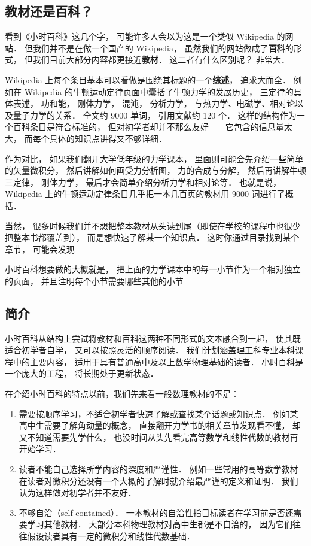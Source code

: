 
\subsection{教材还是百科？}
看到《小时百科》这几个字， 可能许多人会以为这是一个类似 Wikipedia 的网站． 但我们并不是在做一个国产的 Wikipedia， 虽然我们的网站做成了\textbf{百科}的形式， 但我们目前大部分内容都更接近\textbf{教材}． 这二者有什么区别呢？ 非常大．

Wikipedia 上每个条目基本可以看做是围绕其标题的一个\textbf{综述}， 追求大而全． 例如在 Wikipedia 的\href{https://en.wikipedia.org/wiki/Newton's_laws_of_motion}{牛顿运动定律}页面中囊括了牛顿力学的发展历史， 三定律的具体表述， 功和能， 刚体力学， 混沌， 分析力学， 与热力学、电磁学、相对论以及量子力学的关系． 全文约 9000 单词， 引用文献约 120 个． 这样的结构作为一个百科条目是符合标准的， 但对初学者却并不那么友好——它包含的信息量太大， 而每个具体的知识点讲得又不够详细．

作为对比， 如果我们翻开大学低年级的力学课本， 里面则可能会先介绍一些简单的矢量微积分， 然后讲解如何画受力分析图， 力的合成与分解， 然后再讲解牛顿三定律， 刚体力学， 最后才会简单介绍分析力学和相对论等． 也就是说， Wikipedia 上的牛顿运动定律条目几乎把一本几百页的教材用 9000 词进行了概括．

当然， 很多时候我们并不想把整本教材从头读到尾（即使在学校的课程中也很少把整本书都覆盖到）， 而是想快速了解某一个知识点． 这时你通过目录找到某个章节， 可能会发现

小时百科想要做的大概就是， 把上面的力学课本中的每一小节作为一个相对独立的页面， 并且注明每个小节需要哪些其他的小节

\subsection{简介}


小时百科从结构上尝试将教材和百科这两种不同形式的文本融合到一起， 使其既适合初学者自学， 又可以按照灵活的顺序阅读． 我们计划涵盖理工科专业本科课程中的主要内容， 适用于具有普通高中及以上数学物理基础的读者． 小时百科是一个庞大的工程， 将长期处于更新状态．

在介绍小时百科的特点以前，我们先来看一般数理教材的不足：
\begin{enumerate}
\item 需要按顺序学习，不适合初学者快速了解或查找某个话题或知识点． 例如某高中生需要了解角动量的概念， 直接翻开力学书的相关章节发现看不懂， 却又不知道需要先学什么， 也没时间从头先看完高等数学和线性代数的教材再开始学习．
\item 读者不能自己选择所学内容的深度和严谨性． 例如一些常用的高等数学教材在读者对微积分还没有一个大概的了解时就介绍最严谨的定义和证明． 我们认为这样做对初学者并不友好．
\item 不够自洽（self-contained）． 一本教材的自洽性指目标读者在学习前是否还需要学习其他教材． 大部分本科物理教材对高中生都是不自洽的， 因为它们往往假设读者具有一定的微积分和线性代数基础．
\end{enumerate}

